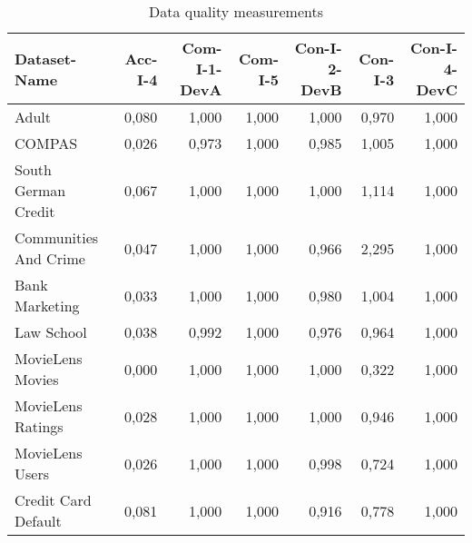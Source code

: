 \begin{table}[t]
\caption{Data quality measurements}
\label{tab:dataquality}
\begin{tabular}{|p{2cm}|r|r|r|r|r|r|}
\hline
Dataset-Name & Acc-I-4 & Com-I-1-DevA & Com-I-5 & Con-I-2-DevB & Con-I-3 & Con-I-4-DevC \\
\hline
Adult & 0,080\cellcolor[HTML]{FDD9CA}& 1,000\cellcolor[HTML]{FEE0D2}& 1,000\cellcolor[HTML]{FEE0D2}& 1,000\cellcolor[HTML]{FEE0D2}& 0,970\cellcolor[HTML]{FC9474}& 1,000\cellcolor[HTML]{FEE0D2}\\
COMPAS & 0,026\cellcolor[HTML]{FDDDCF}& 0,973\cellcolor[HTML]{FDDDCF}& 1,000\cellcolor[HTML]{FEE0D2}& 0,985\cellcolor[HTML]{FDDED0}& 1,005\cellcolor[HTML]{FC9272}& 1,000\cellcolor[HTML]{FEE0D2}\\
South German Credit & 0,067\cellcolor[HTML]{FDDACB}& 1,000\cellcolor[HTML]{FEE0D2}& 1,000\cellcolor[HTML]{FEE0D2}& 1,000\cellcolor[HTML]{FEE0D2}& 1,114\cellcolor[HTML]{FC9272}& 1,000\cellcolor[HTML]{FEE0D2}\\
Communities And Crime & 0,047\cellcolor[HTML]{FDDCCD}& 1,000\cellcolor[HTML]{FEE0D2}& 1,000\cellcolor[HTML]{FEE0D2}& 0,966\cellcolor[HTML]{FDDDCE}& 2,295\cellcolor[HTML]{FC9272}& 1,000\cellcolor[HTML]{FEE0D2}\\
Bank Marketing & 0,033\cellcolor[HTML]{FDDDCE}& 1,000\cellcolor[HTML]{FEE0D2}& 1,000\cellcolor[HTML]{FEE0D2}& 0,980\cellcolor[HTML]{FDDED0}& 1,004\cellcolor[HTML]{FC9272}& 1,000\cellcolor[HTML]{FEE0D2}\\
Law School & 0,038\cellcolor[HTML]{FDDDCE}& 0,992\cellcolor[HTML]{FDDFD1}& 1,000\cellcolor[HTML]{FEE0D2}& 0,976\cellcolor[HTML]{FDDECF}& 0,964\cellcolor[HTML]{FC9475}& 1,000\cellcolor[HTML]{FEE0D2}\\
MovieLens Movies & 0,000\cellcolor[HTML]{FEE0D2}& 1,000\cellcolor[HTML]{FEE0D2}& 1,000\cellcolor[HTML]{FEE0D2}& 1,000\cellcolor[HTML]{FEE0D2}& 0,322\cellcolor[HTML]{FDC6B3}& 1,000\cellcolor[HTML]{FEE0D2}\\
MovieLens Ratings & 0,028\cellcolor[HTML]{FDDDCF}& 1,000\cellcolor[HTML]{FEE0D2}& 1,000\cellcolor[HTML]{FEE0D2}& 1,000\cellcolor[HTML]{FEE0D2}& 0,946\cellcolor[HTML]{FC9677}& 1,000\cellcolor[HTML]{FEE0D2}\\
MovieLens Users & 0,026\cellcolor[HTML]{FDDDCF}& 1,000\cellcolor[HTML]{FEE0D2}& 1,000\cellcolor[HTML]{FEE0D2}& 0,998\cellcolor[HTML]{FDDFD1}& 0,724\cellcolor[HTML]{FCA78C}& 1,000\cellcolor[HTML]{FEE0D2}\\
Credit Card Default & 0,081\cellcolor[HTML]{FDD9CA}& 1,000\cellcolor[HTML]{FEE0D2}& 1,000\cellcolor[HTML]{FEE0D2}& 0,916\cellcolor[HTML]{FDD9C9}& 0,778\cellcolor[HTML]{FCA387}& 1,000\cellcolor[HTML]{FEE0D2}\\
\hline
\end{tabular}
\end{table}
